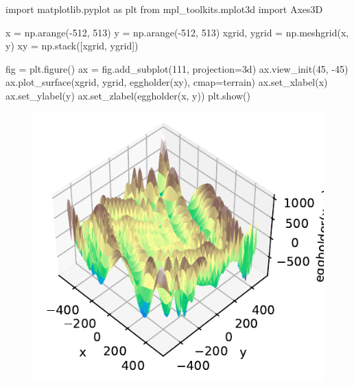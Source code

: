 \documentclass[
  letterpaper,
  DIV=11,
  numbers=noendperiod]{scrreprt}
\newenvironment{Shaded}{\begin{snugshade}}{\end{snugshade}}
\newcommand{\DecValTok}[1]{\textcolor[rgb]{0.68,0.00,0.00}{#1}}
\newcommand{\ImportTok}[1]{\textcolor[rgb]{0.00,0.46,0.62}{#1}}
\newcommand{\NormalTok}[1]{\textcolor[rgb]{0.00,0.23,0.31}{#1}}
\newcommand{\OperatorTok}[1]{\textcolor[rgb]{0.37,0.37,0.37}{#1}}
\newcommand{\StringTok}[1]{\textcolor[rgb]{0.13,0.47,0.30}{#1}}
\begin{document}
\begin{Shaded}
\begin{Highlighting}[]
\ImportTok{import}\NormalTok{ matplotlib.pyplot }\ImportTok{as}\NormalTok{ plt}
\ImportTok{from}\NormalTok{ mpl\_toolkits.mplot3d }\ImportTok{import}\NormalTok{ Axes3D}

\NormalTok{x }\OperatorTok{=}\NormalTok{ np.arange(}\OperatorTok{{-}}\DecValTok{512}\NormalTok{, }\DecValTok{513}\NormalTok{)}
\NormalTok{y }\OperatorTok{=}\NormalTok{ np.arange(}\OperatorTok{{-}}\DecValTok{512}\NormalTok{, }\DecValTok{513}\NormalTok{)}
\NormalTok{xgrid, ygrid }\OperatorTok{=}\NormalTok{ np.meshgrid(x, y)}
\NormalTok{xy }\OperatorTok{=}\NormalTok{ np.stack([xgrid, ygrid])}

\NormalTok{fig }\OperatorTok{=}\NormalTok{ plt.figure()}
\NormalTok{ax }\OperatorTok{=}\NormalTok{ fig.add\_subplot(}\DecValTok{111}\NormalTok{, projection}\OperatorTok{=}\StringTok{\textquotesingle{}3d\textquotesingle{}}\NormalTok{)}
\NormalTok{ax.view\_init(}\DecValTok{45}\NormalTok{, }\OperatorTok{{-}}\DecValTok{45}\NormalTok{)}
\NormalTok{ax.plot\_surface(xgrid, ygrid, eggholder(xy), cmap}\OperatorTok{=}\StringTok{\textquotesingle{}terrain\textquotesingle{}}\NormalTok{)}
\NormalTok{ax.set\_xlabel(}\StringTok{\textquotesingle{}x\textquotesingle{}}\NormalTok{)}
\NormalTok{ax.set\_ylabel(}\StringTok{\textquotesingle{}y\textquotesingle{}}\NormalTok{)}
\NormalTok{ax.set\_zlabel(}\StringTok{\textquotesingle{}eggholder(x, y)\textquotesingle{}}\NormalTok{)}
\NormalTok{plt.show()}
\end{Highlighting}
\end{Shaded}

\begin{figure}[H]

{\centering \includegraphics{003_scipy_optimize_intro_files/figure-pdf/cell-9-output-1.pdf}

}

\end{figure}
\end{document}
